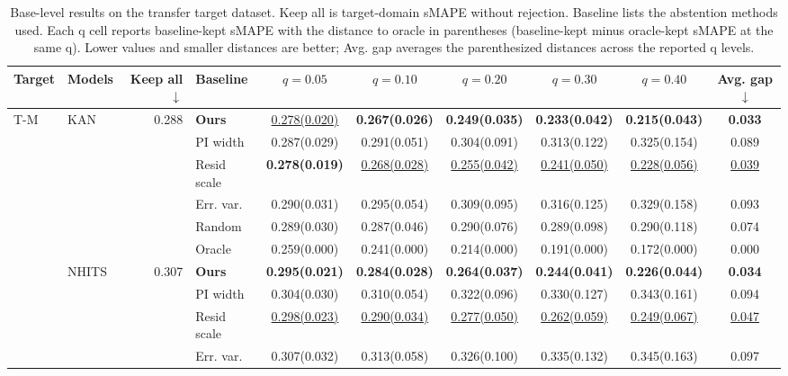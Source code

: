 \begin{table}[t]
\centering
\scriptsize
\setlength{\tabcolsep}{2pt}
\renewcommand{\arraystretch}{0.90}
\caption{Base-level results on the transfer target dataset. Keep all is target-domain sMAPE without rejection. Baseline lists the abstention methods used. Each q cell reports baseline-kept sMAPE with the distance to oracle in parentheses (baseline-kept minus oracle-kept sMAPE at the same q). Lower values and smaller distances are better; Avg. gap averages the parenthesized distances across the reported q levels.}
\label{tab:online-reject-option-gap-to-oracle}
\begin{tabular}{@{}llrlcccccc@{}}
\toprule
Target & Models & Keep all$\downarrow$ & Baseline & $q=0.05$ & $q=0.10$ & $q=0.20$ & $q=0.30$ & $q=0.40$ & Avg. gap$\downarrow$ \\
\midrule
T-M & KAN & 0.288 & \textbf{Ours} & \underline{0.278(0.020)} & \textbf{0.267(0.026)} & \textbf{0.249(0.035)} & \textbf{0.233(0.042)} & \textbf{0.215(0.043)} & \textbf{0.033} \\
 &  &  & PI width & 0.287(0.029) & 0.291(0.051) & 0.304(0.091) & 0.313(0.122) & 0.325(0.154) & 0.089 \\
 &  &  & Resid scale & \textbf{0.278(0.019)} & \underline{0.268(0.028)} & \underline{0.255(0.042)} & \underline{0.241(0.050)} & \underline{0.228(0.056)} & \underline{0.039} \\
 &  &  & Err. var. & 0.290(0.031) & 0.295(0.054) & 0.309(0.095) & 0.316(0.125) & 0.329(0.158) & 0.093 \\
\cmidrule(lr){4-10}
 &  &  & Random & 0.289(0.030) & 0.287(0.046) & 0.290(0.076) & 0.289(0.098) & 0.290(0.118) & 0.074 \\
 &  &  & Oracle & 0.259(0.000) & 0.241(0.000) & 0.214(0.000) & 0.191(0.000) & 0.172(0.000) & 0.000 \\
\cmidrule(lr){2-10}
 & NHITS & 0.307 & \textbf{Ours} & \textbf{0.295(0.021)} & \textbf{0.284(0.028)} & \textbf{0.264(0.037)} & \textbf{0.244(0.041)} & \textbf{0.226(0.044)} & \textbf{0.034} \\
 &  &  & PI width & 0.304(0.030) & 0.310(0.054) & 0.322(0.096) & 0.330(0.127) & 0.343(0.161) & 0.094 \\
 &  &  & Resid scale & \underline{0.298(0.023)} & \underline{0.290(0.034)} & \underline{0.277(0.050)} & \underline{0.262(0.059)} & \underline{0.249(0.067)} & \underline{0.047} \\
 &  &  & Err. var. & 0.307(0.032) & 0.313(0.058) & 0.326(0.100) & 0.335(0.132) & 0.345(0.163) & 0.097 \\

\end{tabular}
\end{table}
